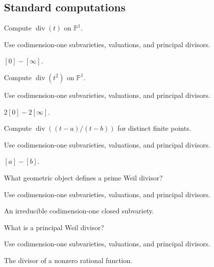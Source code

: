 \subsection*{Standard computations}

\begin{exercise}\label{exr:vi39-expand-01}
Compute $\operatorname{div}(t)$ on $\mathbb P^1$.
\end{exercise}
\begin{hint}
Use codimension-one subvarieties, valuations, and principal divisors.
\end{hint}
\begin{solution}
$[0]-[\infty]$.
\end{solution}

\begin{exercise}[Square]\label{exr:vi39-expand-02}
Compute $\operatorname{div}(t^2)$ on $\mathbb P^1$.
\end{exercise}
\begin{hint}
Use codimension-one subvarieties, valuations, and principal divisors.
\end{hint}
\begin{solution}
$2[0]-2[\infty]$.
\end{solution}

\begin{exercise}[Ratio]\label{exr:vi39-expand-03}
Compute $\operatorname{div}((t-a)/(t-b))$ for distinct finite points.
\end{exercise}
\begin{hint}
Use codimension-one subvarieties, valuations, and principal divisors.
\end{hint}
\begin{solution}
$[a]-[b]$.
\end{solution}

\begin{exercise}\label{exr:vi39-expand-04}
What geometric object defines a prime Weil divisor?
\end{exercise}
\begin{hint}
Use codimension-one subvarieties, valuations, and principal divisors.
\end{hint}
\begin{solution}
An irreducible codimension-one closed subvariety.
\end{solution}

\begin{exercise}[Principal]\label{exr:vi39-expand-05}
What is a principal Weil divisor?
\end{exercise}
\begin{hint}
Use codimension-one subvarieties, valuations, and principal divisors.
\end{hint}
\begin{solution}
The divisor of a nonzero rational function.
\end{solution}

